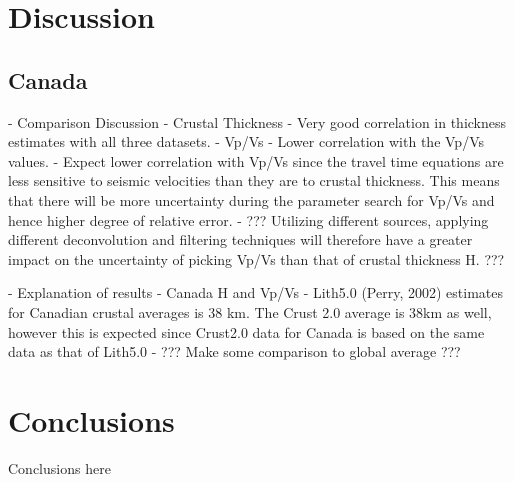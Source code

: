 \documentclass[draft, 12pt]{article}
\begin{document}
\section{Discussion}
\subsection{Canada}

  - Comparison Discussion
    - Crustal Thickness
      - Very good correlation in thickness estimates with all three datasets.
    - Vp/Vs
      - Lower correlation with the Vp/Vs values.
        - Expect lower correlation with Vp/Vs since the travel time equations are
          less sensitive to seismic velocities than they are to crustal thickness.
          This means that there will be more uncertainty during the parameter
          search for Vp/Vs and hence higher degree of relative error.
        - ??? Utilizing different sources, applying different deconvolution and
          filtering techniques will therefore have a greater impact on the
          uncertainty of picking Vp/Vs than that of crustal thickness H. ???

   - Explanation of results
    - Canada H and Vp/Vs
      - Lith5.0 (Perry, 2002) estimates for Canadian crustal averages is 38 km. The Crust
        2.0 average is 38km as well, however this is expected since Crust2.0 data for
        Canada is based on the same data as that of Lith5.0
      - ??? Make some comparison to global average ???


\section{Conclusions}
Conclusions here

\end{document}
